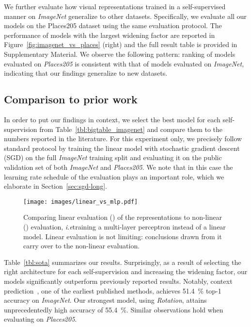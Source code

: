 \documentclass[10pt,twocolumn,letterpaper]{article}
\newcommand{\forceref}[1]{\raisebox{2pt}{\tikz{\draw[#1, line width=0.9pt](0,0) -- (4.5mm,0);}}}
\def\ie{\emph{i.e}\onedot} \def\Ie{\emph{I.e}\onedot}
\begin{document}
We further evaluate how visual representations trained in a self-supervised manner on \emph{ImageNet} generalize to other datasets.
Specifically, we evaluate all our models on the Places205 dataset using the same evaluation protocol.
The performance of models with the largest widening factor are reported in Figure~\ref{fig:imagenet_vs_places} (right) and the full result table is provided in Supplementary Material.
We observe the following pattern: ranking of models evaluated on \emph{Places205} is consistent with that of models evaluated on \emph{ImageNet}, indicating that our findings generalize to new datasets.


\subsection{Comparison to prior work}


In order to put our findings in context, we select the best model for each self-supervision from Table~\ref{tbl:bigtable_imagenet}
and compare them to the numbers reported in the literature.
For this experiment only, we precisely follow standard protocol by training the linear model with stochastic gradient descent (SGD) on the full \emph{ImageNet} training split and evaluating it on the public validation set of both \emph{ImageNet} and \emph{Places205}.
We note that in this case the learning rate schedule of the evaluation plays an important role, which we elaborate in Section~\ref{sec:sgd-long}.

\begin{figure}[t]
  \begin{center}
    \texttt{[image: images/linear\_vs\_mlp.pdf]}
  \end{center}
  \caption{
     Comparing linear evaluation (\protect\forceref{black,dotted}) of the representations to non-linear (\protect\forceref{black}) evaluation, \ie training a multi-layer perceptron instead of a linear model.
     Linear evaluation is not limiting: conclusions drawn from it carry over to the non-linear evaluation.
  }\label{fig:linear_vs_mlp}
\end{figure}

Table~\ref{tbl:sota} summarizes our results.
Surprisingly, as a result of selecting the right architecture for each self-supervision and increasing the widening factor, our models significantly outperform previously reported results.
Notably, context prediction~\cite{doersch2015unsupervised}, one of the earliest published methods, achieves \SI{51.4}{\percent} top-1 accuracy on \emph{ImageNet}.
Our strongest model, using \emph{Rotation}, attains unprecedentedly high accuracy
of \SI{55.4}{\percent}.
Similar observations hold when evaluating on \emph{Places205}.
\end{document}
